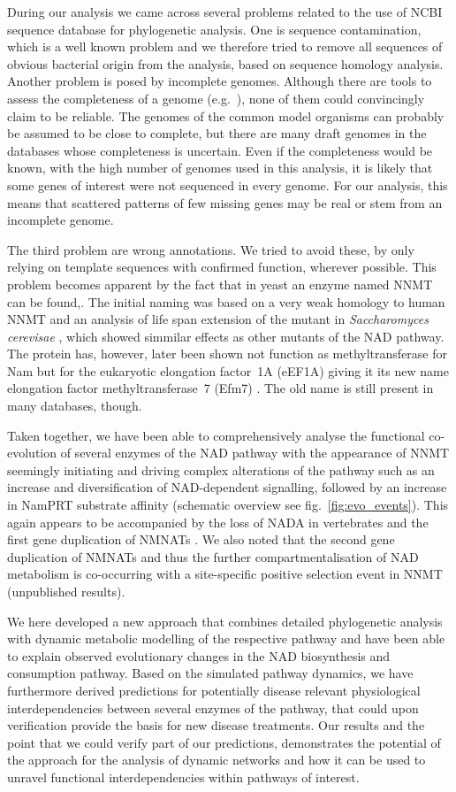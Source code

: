 During our analysis we came across several problems related to the use of NCBI sequence database for phylogenetic analysis. One is sequence contamination, which is a well known problem  and we therefore tried to remove all sequences of obvious bacterial origin from the analysis, based on sequence homology analysis. Another problem is posed by incomplete genomes. Although there are tools to assess the completeness of a genome (e.g.~\cite{Simao2015}), none of them could convincingly claim to be reliable. The genomes of the common model organisms can probably be assumed to be close to complete, but there are many draft genomes in the databases whose completeness is uncertain. Even if the completeness would be known, with the high number of genomes used in this analysis, it is likely that some genes of interest were not sequenced in every genome. For our analysis, this means that scattered patterns of few missing genes may be real or stem from an incomplete genome.

The third problem are wrong annotations. We tried to avoid these, by only relying on template sequences with confirmed function, wherever possible. This problem becomes apparent by the fact that in yeast an enzyme named NNMT can be found,. The initial naming was based on a very weak homology to human NNMT and an analysis of life span extension of the mutant in \textit{Saccharomyces cerevisae} \cite{Anderson2003}, which showed simmilar effects as other mutants of the NAD pathway. The protein has, however, later been shown not function as methyltransferase for Nam but for the eukaryotic elongation factor~1A (eEF1A) giving it its new name elongation factor methyltransferase~7 (Efm7) \cite{Hamey2016}. The old name is still present in many databases, though.

Taken together, we have been able to comprehensively analyse the functional co-evolution of several enzymes of the NAD pathway with the appearance of NNMT seemingly initiating and driving complex alterations of the pathway such as an increase and diversification of NAD-dependent signalling, followed by an increase in NamPRT substrate affinity (schematic overview see fig.~\ref{fig:evo_events}). This again appears to be accompanied by the loss of NADA in vertebrates and the first gene duplication of NMNATs \cite{Lau2010}. We also noted that the second gene duplication of NMNATs and thus the further compartmentalisation of NAD metabolism is co-occurring with a site-specific positive selection event in NNMT (unpublished results). 

We here developed a new approach that combines detailed phylogenetic analysis with dynamic metabolic modelling of the respective pathway and have been able to explain observed evolutionary changes in the NAD biosynthesis and consumption pathway. Based on the simulated pathway dynamics, we have furthermore derived predictions for potentially disease relevant physiological interdependencies between several enzymes of the pathway, that could upon verification provide the basis for new disease treatments. Our results and the point that we could verify part of our predictions, demonstrates the potential of  the approach for the analysis of dynamic networks and how it can be used to unravel functional interdependencies within pathways of interest.